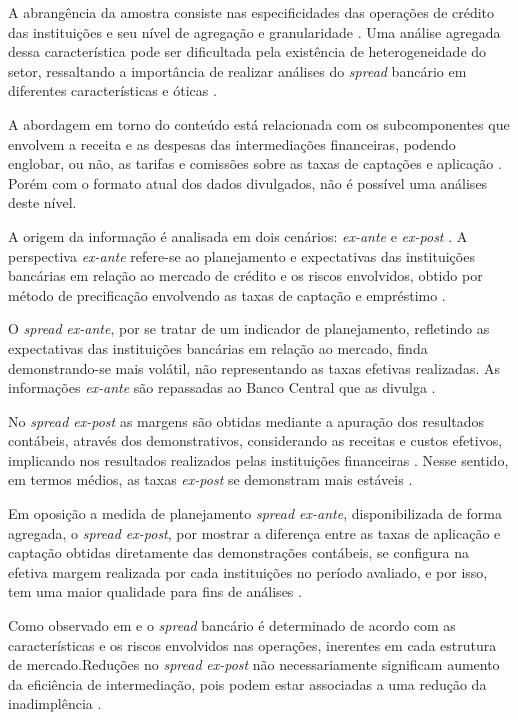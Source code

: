 \documentclass[
  12pt,
  12pt,
  openright,
  oneside,
  a4paper,
  chapter=TITLE,
  section=TITLE,
  subsection=TITLE,
  subsubsection=TITLE,
  portugues,
  sumario=tradicional]{abntex2}
\begin{document}
A abrangência da amostra consiste nas especificidades das operações de crédito das instituições e seu nível de agregação e granularidade \cite{costa;nakane:2004}. Uma análise agregada dessa característica pode ser dificultada pela existência de heterogeneidade do setor, ressaltando a importância de realizar análises do \emph{spread} bancário em diferentes características e óticas \cite{block:2000}.

A abordagem em torno do conteúdo está relacionada com os subcomponentes que envolvem a receita e as despesas das intermediações financeiras, podendo englobar, ou não, as tarifas e comissões sobre as taxas de captações e aplicação \cite{block:2000}. Porém com o formato atual dos dados divulgados, não é possível uma análises deste nível.

A origem da informação é analisada em dois cenários: \emph{ex-ante} e \emph{ex-post} \cite{kunt:1999, levine:1997}. A perspectiva \emph{ex-ante} refere-se ao planejamento e expectativas das instituições bancárias em relação ao mercado de crédito e os riscos envolvidos, obtido por método de precificação envolvendo as taxas de captação e empréstimo \cite{durigan:2018, leal:2006, dantas:2012}.

O \emph{spread} \emph{ex-ante}, por se tratar de um indicador de planejamento, refletindo as expectativas das instituições bancárias em relação ao mercado, finda demonstrando-se mais volátil, não representando as taxas efetivas realizadas. As informações \emph{ex-ante} são repassadas ao Banco Central que as divulga \cite{durigan:2018, leal:2006, dantas:2012}.

No \emph{spread ex-post} as margens são obtidas mediante a apuração dos resultados contábeis, através dos demonstrativos, considerando as receitas e custos efetivos, implicando nos resultados realizados pelas instituições financeiras \cite{kunt:1999, durigan:2018}. Nesse sentido, em termos médios, as taxas \emph{ex-post} se demonstram mais estáveis \cite{leal:2006, dantas:2012}.

Em oposição a medida de planejamento \emph{spread ex-ante}, disponibilizada de forma agregada, o \emph{spread ex-post}, por mostrar a diferença entre as taxas de aplicação e captação obtidas diretamente das demonstrações contábeis, se configura na efetiva margem realizada por cada instituições no período avaliado, e por isso, tem uma maior qualidade para fins de análises \cite{dantas:2012}.

Como observado em \textcite{klein:1971} e \textcite{ho-saunders:1981} o \emph{spread} bancário é determinado de acordo com as características e os riscos envolvidos nas operações, inerentes em cada estrutura de mercado.Reduções no \emph{spread} \emph{ex-post} não necessariamente significam aumento da eficiência de intermediação, pois podem estar associadas a uma redução da inadimplência \cite{kunt:1999}.
\end{document}
